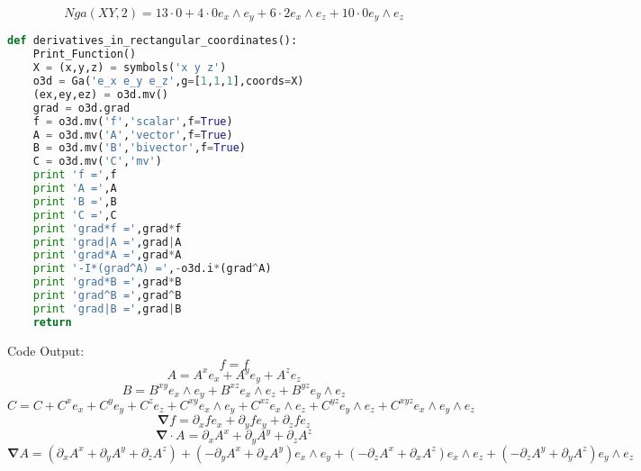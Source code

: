 \documentclass[10pt,fleqn]{report}
\begin{document}
\begin{equation*} Nga(X Y,2) = 13 \cdot 0  + 4 \cdot 0 e_{x}\wedge e_{y} + 6 \cdot 2 e_{x}\wedge e_{z} + 10 \cdot 0 e_{y}\wedge e_{z} \end{equation*}
\begin{lstlisting}[language=Python,showspaces=false,showstringspaces=false,backgroundcolor=\color{gray},frame=single]
def derivatives_in_rectangular_coordinates():
    Print_Function()
    X = (x,y,z) = symbols('x y z')
    o3d = Ga('e_x e_y e_z',g=[1,1,1],coords=X)
    (ex,ey,ez) = o3d.mv()
    grad = o3d.grad
    f = o3d.mv('f','scalar',f=True)
    A = o3d.mv('A','vector',f=True)
    B = o3d.mv('B','bivector',f=True)
    C = o3d.mv('C','mv')
    print 'f =',f
    print 'A =',A
    print 'B =',B
    print 'C =',C
    print 'grad*f =',grad*f
    print 'grad|A =',grad|A
    print 'grad*A =',grad*A
    print '-I*(grad^A) =',-o3d.i*(grad^A)
    print 'grad*B =',grad*B
    print 'grad^B =',grad^B
    print 'grad|B =',grad|B
    return
\end{lstlisting}
Code Output:
\begin{equation*} f = f \end{equation*}
\begin{equation*} A = A^{x}  e_{x} + A^{y}  e_{y} + A^{z}  e_{z} \end{equation*}
\begin{equation*} B = B^{xy}  e_{x}\wedge e_{y} + B^{xz}  e_{x}\wedge e_{z} + B^{yz}  e_{y}\wedge e_{z} \end{equation*}
\begin{equation*} C = C  + C^{x} e_{x} + C^{y} e_{y} + C^{z} e_{z} + C^{xy} e_{x}\wedge e_{y} + C^{xz} e_{x}\wedge e_{z} + C^{yz} e_{y}\wedge e_{z} + C^{xyz} e_{x}\wedge e_{y}\wedge e_{z} \end{equation*}
\begin{equation*} \boldsymbol{\nabla}  f = \partial_{x} f  e_{x} + \partial_{y} f  e_{y} + \partial_{z} f  e_{z} \end{equation*}
\begin{equation*} \boldsymbol{\nabla} \cdot A = \partial_{x} A^{x}  + \partial_{y} A^{y}  + \partial_{z} A^{z} \end{equation*}
\begin{equation*} \boldsymbol{\nabla}  A = \left ( \partial_{x} A^{x}  + \partial_{y} A^{y}  + \partial_{z} A^{z} \right )  + \left ( - \partial_{y} A^{x}  + \partial_{x} A^{y} \right ) e_{x}\wedge e_{y} + \left ( - \partial_{z} A^{x}  + \partial_{x} A^{z} \right ) e_{x}\wedge e_{z} + \left ( - \partial_{z} A^{y}  + \partial_{y} A^{z} \right ) e_{y}\wedge e_{z} \end{equation*}
\end{document}
